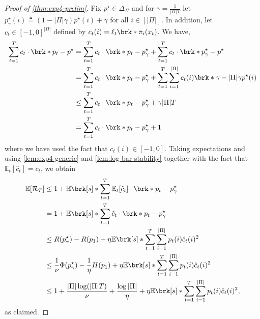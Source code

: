 \documentclass[11pt]{article}
\newcommand{\eqdef}{\triangleq}
\newcommand{\bbE}{\boldsymbol{\mathbb{E}}}
\renewcommand{\E}{\bbE}
\newcommand{\regret}{\mathcal{R}}
\theoremstyle{plain}
\begin{document}
\begin{proof}[Proof of \cref{thm:exp4-prelim}]
    Fix $p^\star \in \Delta_\Pi$ and for $\gamma = \frac{1}{|\Pi|T}$ let $p^\star_\gamma(i) \eqdef (1-|\Pi|\gamma)p^\star(i) + \gamma$ for all $i \in [|\Pi|]$. In addition, let $c_t \in [-1,0]^{|\Pi|}$ defined by $c_t(i) = \ell_t \brk*{\pi_i(x_t)}$. We have,
    \begin{align*}
        \sum_{t=1}^T c_t \cdot \brk*{p_t - p^\star}
        &=
        \sum_{t=1}^T c_t \cdot \brk*{p_t - p^\star_\gamma} + \sum_{t=1}^T c_t \cdot \brk*{p^\star_\gamma - p^\star} \\
        &=
        \sum_{t=1}^T c_t \cdot \brk*{p_t - p^\star_\gamma} + \sum_{t=1}^T \sum_{i=1}^{|\Pi|} c_t(i) \brk*{\gamma - |\Pi|\gamma p^\star(i)} \\
        &\leq
        \sum_{t=1}^T c_t \cdot \brk*{p_t - p^\star_\gamma} + \gamma |\Pi|T \\
        &=
        \sum_{t=1}^T c_t \cdot \brk*{p_t - p^\star_\gamma} + 1
    \end{align*}
    where we have used the fact that $c_t(i) \in [-1,0]$. Taking expectations and using \cref{lem:exp4-generic} and \cref{lem:log-bar-stability} together with the fact that $\E_t[\hat c_t] = c_t$, we obtain
    \begin{align*}
        \E[\regret_T]
        &\leq
        1 + \E \brk[s]*{\sum_{t=1}^T \E_t[\hat c_t] \cdot \brk*{p_t - p^\star_\gamma}} \\
        &=
        1 + \E \brk[s]*{\sum_{t=1}^T \hat c_t \cdot \brk*{p_t - p^\star_\gamma}} \\
        &\leq 
        R(p^\star_\gamma) - R(p_1) + \eta \E \brk[s]*{\sum_{t=1}^T \sum_{i=1}^{|\Pi|}  p_t(i) \hat c_t(i)^2 } \\
        &\leq
        \frac{1}{\nu}\Phi(p^\star_\gamma) - \frac{1}{\eta}H(p_1) + \eta \E \brk[s]*{\sum_{t=1}^T \sum_{i=1}^{|\Pi|}  p_t(i) \hat c_t(i)^2 } \\
        &\leq
        1 + \frac{|\Pi| \log (|\Pi|T)}{\nu} + \frac{\log |\Pi|}{\eta} + \eta \E \brk[s]*{\sum_{t=1}^T \sum_{i=1}^{|\Pi|}  p_t(i)\hat c_t(i)^2},
    \end{align*}
    as claimed.
\end{proof}
\end{document}
